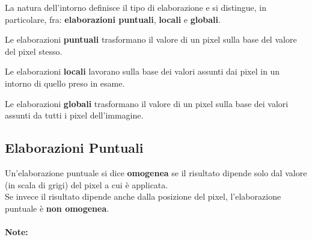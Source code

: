 La natura dell'intorno definisce il tipo di elaborazione e si distingue,
in particolare, fra: \textbf{elaborazioni puntuali}, \textbf{locali} e \textbf{globali}.

\begin{definition}
    Le elaborazioni \textbf{puntuali} trasformano il valore di un pixel sulla
    base del valore del pixel stesso.
\end{definition}

\begin{definition}
    Le elaborazioni \textbf{locali} lavorano sulla base dei valori assunti dai pixel in
    un intorno di quello preso in esame.
\end{definition}

\begin{definition}
    Le elaborazioni \textbf{globali} trasformano il valore di un pixel sulla
    base dei valori assunti da tutti i pixel dell'immagine.
\end{definition}

\subsection{Elaborazioni Puntuali}

\begin{definition}
    Un'elaborazione puntuale si dice \textbf{omogenea} se il risultato
    dipende solo dal valore (in scala di grigi) del pixel a cui è applicata.\\
    Se invece il risultato dipende anche dalla posizione del pixel,
    l'elaborazione puntuale è \textbf{non omogenea}.
\end{definition}

\paragraph{Note:}

